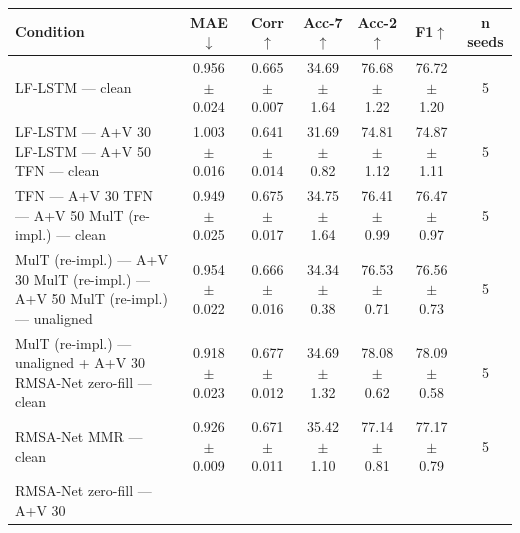 \begin{tabular}{lcccccc}
\hline
Condition & MAE$\downarrow$ & Corr$\uparrow$ & Acc-7$\uparrow$ & Acc-2$\uparrow$ & F1$\uparrow$ & n seeds \\
\hline
LF-LSTM — clean & 0.956 $\pm$ 0.024 & 0.665 $\pm$ 0.007 & 34.69 $\pm$ 1.64 & 76.68 $\pm$ 1.22 & 76.72 $\pm$ 1.20 & 5 \\
LF-LSTM — A+V 30%
LF-LSTM — A+V 50%
TFN — clean & 1.003 $\pm$ 0.016 & 0.641 $\pm$ 0.014 & 31.69 $\pm$ 0.82 & 74.81 $\pm$ 1.12 & 74.87 $\pm$ 1.11 & 5 \\
TFN — A+V 30%
TFN — A+V 50%
MulT (re-impl.) — clean & 0.949 $\pm$ 0.025 & 0.675 $\pm$ 0.017 & 34.75 $\pm$ 1.64 & 76.41 $\pm$ 0.99 & 76.47 $\pm$ 0.97 & 5 \\
MulT (re-impl.) — A+V 30%
MulT (re-impl.) — A+V 50%
MulT (re-impl.) — unaligned & 0.954 $\pm$ 0.022 & 0.666 $\pm$ 0.016 & 34.34 $\pm$ 0.38 & 76.53 $\pm$ 0.71 & 76.56 $\pm$ 0.73 & 5 \\
MulT (re-impl.) — unaligned + A+V 30%
RMSA-Net zero-fill — clean & 0.918 $\pm$ 0.023 & 0.677 $\pm$ 0.012 & 34.69 $\pm$ 1.32 & 78.08 $\pm$ 0.62 & 78.09 $\pm$ 0.58 & 5 \\
RMSA-Net MMR — clean & 0.926 $\pm$ 0.009 & 0.671 $\pm$ 0.011 & 35.42 $\pm$ 1.10 & 77.14 $\pm$ 0.81 & 77.17 $\pm$ 0.79 & 5 \\
RMSA-Net zero-fill — A+V 30%

\end{tabular}

